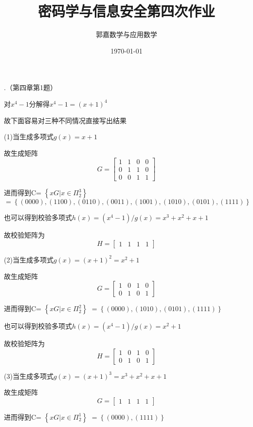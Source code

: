 \documentclass{ctexart}
\title{密码学与信息安全第四次作业}
\author{郭嘉\quad17345019\quad 数学与应用数学}
\date{\today}
\begin{document}
	.（第四章第1题）
	
	对$x^4-1$分解得$x^4-1=(x+1)^4$
	
	故下面容易对三种不同情况直接写出结果
    
    (1)当生成多项式$g(x)=x+1$
    
    故生成矩阵$$G=
    \begin{bmatrix}
    1 & 1 & 0 & 0\\
    0 & 1 & 1 & 0\\
    0 & 0 & 1 & 1
    \end{bmatrix} 
    $$
    
    进而得到C=
    $\left\lbrace xG|x\in \Pi_{2}^{3}\right\rbrace$ 
    $=\left\lbrace(0000),(1 1 0 0),(0 1 1 0),(0 0 1 1),(1 0 0 1),(1 0 1 0),(0 1 0 1),(1111)\right\rbrace$
    
    也可以得到校验多项式$h(x)=(x^4-1)/g(x)=x^3+x^2+x+1$
    
    故校验矩阵为$$H=
    \begin{bmatrix}
    1 & 1 & 1 & 1
    
    \end{bmatrix} 
    $$
    
    (2)当生成多项式$g(x)=(x+1)^2=x^2+1$
    
    故生成矩阵$$G=
    \begin{bmatrix}
    1 & 0 & 1 & 0\\
    0 & 1 & 0 & 1
    \end{bmatrix} 
    $$
    
    进而得到C=
    $\left\lbrace xG|x\in \Pi_{2}^{2}\right\rbrace$ 
    $=\left\lbrace(0000),(1 0 1 0),(0 1 0 1),(1111)\right\rbrace$
    
    也可以得到校验多项式$h(x)=(x^4-1)/g(x)=x^2+1$
    
    故校验矩阵为$$H=
    \begin{bmatrix}
    1 & 0 & 1 & 0\\
    0 & 1 & 0 & 1
    \end{bmatrix} 
    $$
    
    (3)当生成多项式$g(x)=(x+1)^3=x^3+x^2+x+1$
    
    故生成矩阵$$G=
    \begin{bmatrix}
    1 & 1 & 1 & 1
    \end{bmatrix} 
    $$
    
    进而得到C=
    $\left\lbrace xG|x\in \Pi_{2}^{1}\right\rbrace$ 
    $=\left\lbrace(0000),(1111)\right\rbrace$
    
\end{document}
